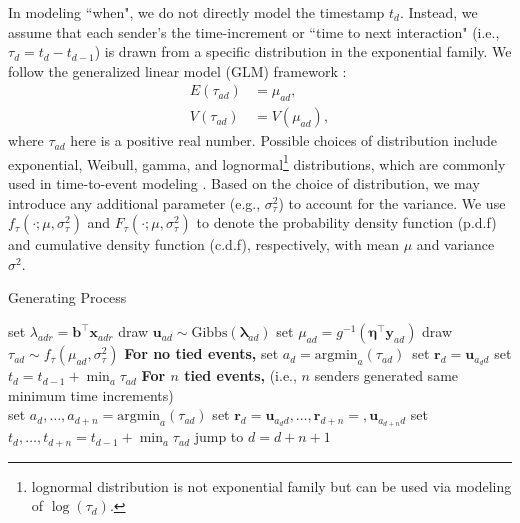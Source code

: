 \documentclass[ba]{imsart}
\numberwithin{equation}{section}
\theoremstyle{plain}
\begin{document}
In modeling ``when", we do not directly model the timestamp $t_d$. Instead, we assume that each sender's the time-increment or ``time to next interaction" (i.e., $\tau_{d} = t_d-t_{d-1}$) is drawn from a specific distribution in the exponential family.  We follow the generalized linear model (GLM) framework \citep{nelder1972generalized}:
\begin{equation}
\begin{aligned}
E(\tau_{ad}) &= \mu_{ad},\\
V(\tau_{ad}) &= V(\mu_{ad}),
\end{aligned}
\end{equation}
where $\tau_{ad}$ here is a positive real number. Possible choices of distribution include exponential, Weibull, gamma, and lognormal\footnote{lognormal distribution is not exponential family but can be used via modeling of $\log(\tau_d)$.} distributions, which are commonly used in time-to-event modeling \citep{rao2000applied,rizopoulos2012joint}. Based on the choice of distribution, we may introduce any additional parameter (e.g., $\sigma_\tau^2$) to account for the variance. We use $f_\tau(\cdot; \mu, \sigma_\tau^2)$ and $F_\tau(\cdot; \mu, \sigma_\tau^2)$ to denote the probability density function (p.d.f) and cumulative density function (c.d.f), respectively, with mean $\mu$ and variance $\sigma^2$.
	\begin{algorithm}[!b]
		\SetAlgoLined
		\caption{Generating Process}
		\begin{algorithmic}
				\STATE	set $\lambda_{adr} = {\boldsymbol{b}}^{\top}\boldsymbol{x}_{adr}$
					\ENDFOR
					\STATE	draw $\boldsymbol{u}_{ad}  \sim
				\mbox{Gibbs}(\boldsymbol{\lambda}_{ad})$
				\STATE		set $\mu_{ad} = g^{-1}(\boldsymbol{\eta}^\top \boldsymbol{y}_{ad})$
				\STATE		draw $\tau_{ad} \sim f_\tau(\mu_{ad}, \sigma_\tau^2)$
					\ENDFOR
				\STATE	\textbf{For no tied events,}
				\STATE	set $a_d= \mbox{argmin}_{a}(\tau_{ad})$\
			\STATE		set $\boldsymbol{r}_d = \boldsymbol{u}_{a_d d}$
				\STATE	set $t_d =t_{d-1} + \min_a\tau_{ad}$
				\STATE	\textbf{For $n$ tied events,} (i.e., $n$ senders generated same minimum time increments)\\
				\STATE	set $a_d, \ldots, a_{d+n}= \mbox{argmin}_{a}(\tau_{ad})$
				\STATE	set $\boldsymbol{r}_d=\boldsymbol{u}_{a_d d},\ldots,\boldsymbol{r}_{d+n}= ,\boldsymbol{u}_{a_{d+n} d}$
				\STATE	set $t_d, \ldots, t_{d+n}=t_{d-1} + \min_a\tau_{ad}$
			\STATE		jump to $d = d+n+1$
			\ENDFOR
		\end{algorithmic}
		\label{alg:generative}
	\end{algorithm}
\end{document}
